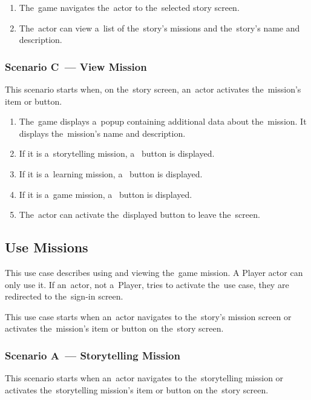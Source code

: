 \begin{enumerate}
    \item The~game navigates the~actor to the~selected story screen.
    \item The~actor can view a~list of the~story's missions and the~story's name and description.
\end{enumerate}

\subsubsection*{Scenario C~--- View Mission}

This scenario starts when, on the~story screen, an~actor activates the~mission's item or button.

\begin{enumerate}
    \item The~game displays a~popup containing additional data about the~mission.
    It displays the~mission's name and description.
    \item If it is a~storytelling mission, a~ button is displayed.
    \item If it is a~learning mission, a~ button is displayed.
    \item If it is a~game mission, a~ button is displayed.
    \item The~actor can activate the~displayed button to leave the~screen.
\end{enumerate}

\pagebreak
\subsection{Use Missions}

This use case describes using and viewing the~game mission.
A Player actor can only use it.
If an~actor, not a~Player, tries to activate the~use case, they are redirected to the~sign-in screen.

This use case starts when an~actor navigates to the~story's mission screen or activates the~mission's item or button on the~story screen.

\subsubsection*{Scenario A~--- Storytelling Mission}

This scenario starts when an~actor navigates to the~storytelling mission or activates the~storytelling mission's item or button on the~story screen.

